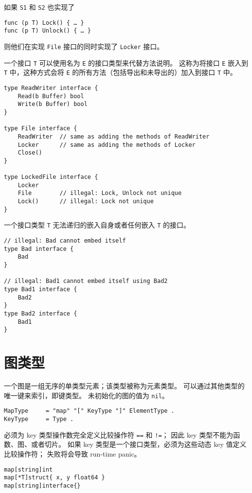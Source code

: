如果 \lstinline|S1| 和 \lstinline|S2| 也实现了
\begin{lstlisting}[style=golang]
func (p T) Lock() { … }
func (p T) Unlock() { … }
\end{lstlisting}
则他们在实现 \lstinline|File| 接口的同时实现了 \lstinline|Locker| 接口。

一个接口 \lstinline|T| 可以使用名为 \lstinline|E| 的接口类型来代替方法说明。
这称为将接口 \lstinline|E| 嵌入到 \lstinline|T| 中，这种方式会将 \lstinline|E| 的所有方法（包括导出和未导出的）加入到接口 \lstinline|T| 中。
\begin{lstlisting}[style=golang]
type ReadWriter interface {
	Read(b Buffer) bool
	Write(b Buffer) bool
}

type File interface {
	ReadWriter  // same as adding the methods of ReadWriter
	Locker      // same as adding the methods of Locker
	Close()
}

type LockedFile interface {
	Locker
	File        // illegal: Lock, Unlock not unique
	Lock()      // illegal: Lock not unique
}
\end{lstlisting}

一个接口类型 \lstinline|T| 无法递归的嵌入自身或者任何嵌入 \lstinline|T| 的接口。
\begin{lstlisting}[style=golang]
// illegal: Bad cannot embed itself
type Bad interface {
	Bad
}

// illegal: Bad1 cannot embed itself using Bad2
type Bad1 interface {
	Bad2
}
type Bad2 interface {
	Bad1
}
\end{lstlisting}

\section{图类型}
一个图是一组无序的单类型元素；该类型被称为元素类型。
可以通过其他类型的唯一键来索引，即键类型。
未初始化的图的值为 \lstinline|nil|。
\begin{lstlisting}[style=EBNF]
MapType     = "map" "[" KeyType "]" ElementType .
KeyType     = Type .
\end{lstlisting}

必须为 key 类型操作数完全定义比较操作符 \lstinline|==| 和 \lstinline|!=|；
因此 key 类型不能为函数、图、或者切片。
如果 key 类型是一个接口类型，必须为这些动态 key 值定义比较操作符；
失败将会导致 run-time panic。
\begin{lstlisting}[style=golang]
map[string]int
map[*T]struct{ x, y float64 }
map[string]interface{}
\end{lstlisting}

